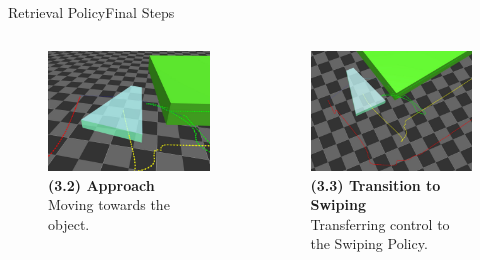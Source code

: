 \documentclass[AIRbeamer
,optEnglish
,optBiber
,optBibstyleAlphabetic
,optBeamerClassicFormat%
]{AIRlatex}
\begin{document}
    \begin{frame}[c]{Retrieval Policy}{Final Steps}
        \begin{columns}[T,onlytextwidth]
            \begin{column}[T]{0.48\textwidth}
                \begin{figure}[H]
                    \centering
                    \captionsetup{justification=centering}
                    \includegraphics[width=\textwidth]{figures/retrieval/approach}
                    \caption{\textbf{(3.2) Approach}\\Moving towards the object.}
                \end{figure}
            \end{column}
            \begin{column}[T]{0.48\textwidth}
                \begin{figure}[H]
                    \centering
                    \captionsetup{justification=centering}
                    \includegraphics[width=\textwidth]{figures/retrieval/trajectory}
                    \caption{\textbf{(3.3) Transition to Swiping}\\Transferring control to the Swiping Policy.}
                \end{figure}
            \end{column}
        \end{columns}
    \end{frame}
\end{document}
